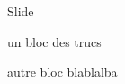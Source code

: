 \begin{frame}{Slide}

\begin{block}{un bloc}
    des trucs
\end{block}

\begin{block}{autre bloc}
	blablalba
\end{block}

\end{frame}
